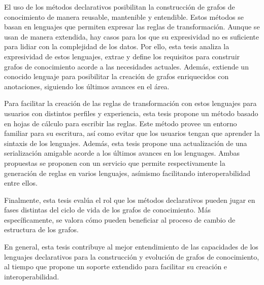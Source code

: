 El uso de los métodos declarativos posibilitan la construcción de grafos de conocimiento de manera reusable, mantenible y entendible. Estos métodos se basan en lenguajes que permiten expresar las reglas de transformación. Aunque se usan de manera extendida, hay casos para los que su expresividad no es suficiente para lidiar con la complejidad de los datos. Por ello, esta tesis analiza la expresividad de estos lenguajes, extrae y define los requisitos para construir grafos de conocimiento acorde a las necesidades actuales. Además, extiende un conocido lenguaje para posibilitar la creación de grafos enriquecidos con anotaciones, siguiendo los últimos avances en el área.

Para facilitar la creación de las reglas de transformación con estos lenguajes para usuarios con distintos perfiles y experiencia, esta tesis propone un método basado en hojas de cálculo para escribir las reglas. Este método provee un entorno familiar para su escritura, así como evitar que los usuarios tengan que aprender la sintaxis de los lenguajes. Además, esta tesis propone una actualización de una serialización amigable acorde a los últimos avances en los lenguages. Ambas propuestas se proponen con un servicio que permite respectivamente la generación de reglas en varios lenguajes, asímismo facilitando interoperabilidad entre ellos.

Finalmente, esta tesis evalúa el rol que los métodos declarativos pueden jugar en fases distintas del ciclo de vida de los grafos de conocimiento. Más específicamente, se valora cómo pueden beneficiar al proceso de cambio de estructura de los grafos. 

En general, esta tesis contribuye al mejor entendimiento de las capacidades de los lenguajes declarativos para la construcción y evolución de grafos de conocimiento, al tiempo que propone un soporte extendido para facilitar su creación e interoperabilidad. 
